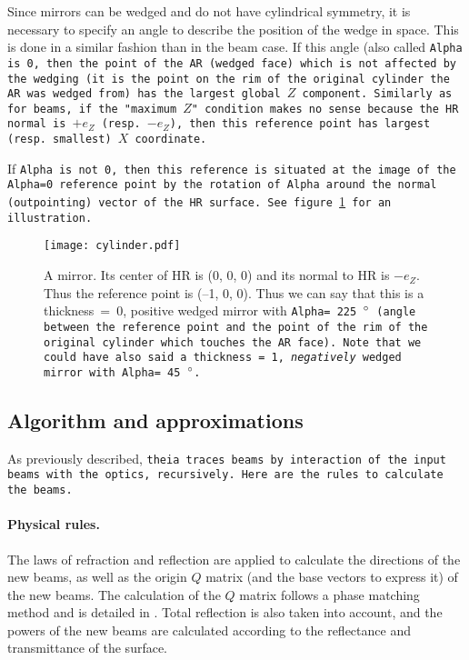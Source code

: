\documentclass{article}
\begin{document}
Since mirrors can be wedged and do not have cylindrical symmetry, it is necessary to specify an angle to describe the position of the wedge in space. This is done in a similar fashion than in the beam case. If this angle (also called \tt{Alpha} is 0, then the point of the AR (wedged face) which is not affected by the wedging (it is the point on the rim of the original cylinder the AR was wedged from) has the largest global $Z$ component. Similarly as for beams, if the "maximum $Z$" condition makes no sense because the HR normal is  $+ e_Z$ (resp. $-e_Z$), then this reference point has largest (resp. smallest) $X$ coordinate.

If \tt{Alpha} is not 0, then this reference is situated at the image of the \tt{Alpha=0} reference point by the rotation of \tt{Alpha} around the normal (outpointing) vector of the HR surface. See figure \ref{cylinder} for an illustration.


\begin{figure}[h]
\begin{center}
\texttt{[image: cylinder.pdf]}
\caption{A mirror. Its center of HR is (0, 0, 0) and its normal to HR is $-e_Z$. Thus the reference point is (--1, 0, 0). Thus we can say that this is a thickness~=~0, positive wedged mirror with \tt{Alpha=}~225~$\degree$ (angle between the reference point and the point of the rim of the original cylinder which touches the AR face). Note that we could have also said a thickness~=~1, \textit{negatively} wedged mirror with \tt{Alpha=}~45~$\degree$.}
\label{cylinder}
\end{center}
\end{figure}


\subsection{Algorithm and approximations}
As previously described, \tt{theia} traces beams by interaction of the input beams with the optics, recursively. Here are the rules to calculate the beams.

\paragraph{Physical rules.}The laws of refraction and reflection are applied to calculate the directions of the new beams, as well as the origin $Q$ matrix (and the base vectors to express it) of the new beams.  The calculation of the $Q$ matrix follows a phase matching method and is detailed in \cite{1,2}. Total reflection is also taken into account, and the powers of the new beams are calculated according to the reflectance and transmittance of the surface. 
\end{document}

